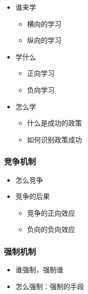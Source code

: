 \documentclass[
  12pt,
]{ctexart}
\begin{document}
\begin{itemize}
\item
  谁来学

  \begin{itemize}
  \item
    横向的学习
  \item
    纵向的学习
  \end{itemize}
\item
  学什么

  \begin{itemize}
  \item
    正向学习
  \item
    负向学习
  \end{itemize}
\item
  怎么学

  \begin{itemize}
  \item
    什么是成功的政策
  \item
    如何识别政策成功
  \end{itemize}
\end{itemize}

\hypertarget{ux7adeux4e89ux673aux5236}{%
\subsubsection{竞争机制}\label{ux7adeux4e89ux673aux5236}}

\begin{itemize}
\item
  怎么竞争
\item
  竞争的后果

  \begin{itemize}
  \item
    竞争的正向效应
  \item
    负向的负向效应
  \end{itemize}
\end{itemize}

\hypertarget{ux5f3aux5236ux673aux5236}{%
\subsubsection{强制机制}\label{ux5f3aux5236ux673aux5236}}

\begin{itemize}
\item
  谁强制，强制谁
\item
  怎么强制：强制的手段
\end{itemize}
\end{document}
